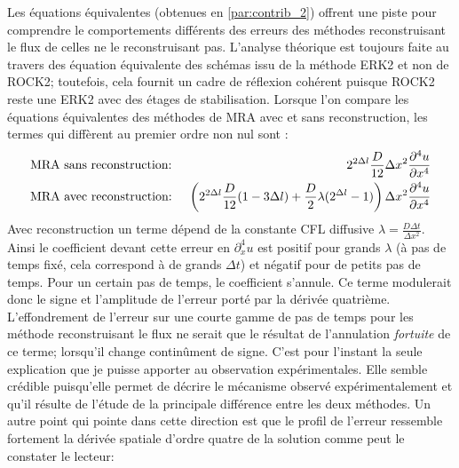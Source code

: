 Les équations équivalentes (obtenues en \ref{par:contrib_2}) offrent une piste pour comprendre le comportements différents des erreurs des méthodes reconstruisant le flux de celles ne le reconstruisant pas.
L'analyse théorique est toujours faite au travers des équation équivalente des schémas issu de la méthode ERK2 et non de ROCK2; 
toutefois, cela fournit un cadre de réflexion cohérent puisque ROCK2 reste une ERK2 avec des étages de stabilisation.
Lorsque l'on compare les équations équivalentes des méthodes de MRA avec et sans reconstruction, les termes qui diffèrent au premier ordre non nul sont : 
\begin{align}
    \notag
    &\text{MRA sans reconstruction: }& 2^{2 \Delta l} \frac{D}{12}\Delta x^2 \frac{\partial^4 u}{\partial x^4}
    \\\notag
    &\text{MRA avec reconstruction: }& \left( 2^{2 \Delta l}\frac{D}{12}(1-3\Delta l) + \frac{D}{2} \lambda (2^{\Delta l} - 1)\right) \Delta x^2 \frac{\partial^4 u}{\partial x^4}
\end{align}
Avec reconstruction un terme dépend de la constante CFL diffusive $\lambda = \frac{D \Delta t}{\Delta x^2}$. Ainsi le coefficient devant cette erreur en $\partial_x^4 u$ 
est positif pour grands $\lambda$ (à pas de temps fixé, cela correspond à de grands $\Delta t$) et négatif pour de petits pas de temps. Pour un certain pas de temps, le coefficient s'annule.
Ce terme modulerait donc le signe et l'amplitude de l'erreur porté par la dérivée quatrième. 
L'effondrement de l'erreur sur une courte gamme de pas de temps pour les méthode 
reconstruisant le flux ne serait que le résultat de l'annulation \textit{fortuite} de ce terme; lorsqu'il change continûment de signe. 
C'est pour l'instant la seule explication que je puisse apporter au observation expérimentales.
Elle semble crédible puisqu'elle permet de décrire le mécanisme observé expérimentalement et qu'il résulte de l'étude de la principale différence entre les deux méthodes. 
Un autre point qui pointe dans cette direction est que le profil de l'erreur ressemble fortement la dérivée spatiale d'ordre quatre de la solution comme peut le constater le lecteur:
\begin{figure}
    
\end{figure}